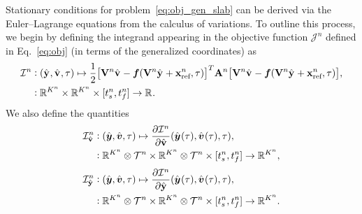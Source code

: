 Stationary conditions for problem~\eqref{eq:obj_gen_slab} can be derived via 
	the Euler--Lagrange equations from the
calculus of variations. To outline this process, we begin by defining the
integrand appearing in the objective function $\mathcal{J}^n$ defined in Eq.~\eqref{eq:obj} (in terms of the generalized
coordinates) as 
\begin{equation}\label{eq:integrand}
\begin{split}
 \minintegrandArg{n} & \vcentcolon
(\genstateyDiscreteArgnt{}, \genstateyDiscreteDotArgnt{},\timeDummy) \mapsto \frac{1}{2} \big[
\basisspaceArg{n} \genstateyDiscreteDotArgnt{} - \velocity(\basisspaceArg{n} \genstateyDiscreteArgnt{}
+ \stateInterceptArg{n},\timeDummy ) \big]^T \stweightingMatArgt{n}{t} \big[
\basisspaceArg{n} \genstateyDiscreteDotArgnt{}  - \velocity(\basisspaceArg{n} \genstateyDiscreteArgnt{} +
\stateInterceptArg{n},\timeDummy) \big], \\ & \vcentcolon \RR{\romdimArg{n}} \times \RR{\romdimArg{n}} \times [\timeStartArg{n},\timeEndArg{n}]
 \rightarrow \RR{} .  
\end{split}
\end{equation}
We also define the quantities
\begin{equation}
\begin{split}
\dIdVArg{n}  & \vcentcolon
(\genstatey , \genstateyDot, \timeDummy) \mapsto \frac{\partial \minintegrandArg{n}}{\partial \genstateyDiscreteDot} (\genstateyArg{}{\timeDummy}, \genstateyDotArg{}{\timeDummy},\timeDummy), \\ 
& \vcentcolon  \RR{\romdimArg{n}} \otimes \timeSpaceArg{n} \times \RR{\romdimArg{n}} \otimes \timeSpaceArg{n} \times [\timeStartArg{n},\timeEndArg{n}]
 \rightarrow \RR{\romdimArg{n}} ,
\end{split}
\end{equation}
\begin{equation}
\begin{split}
\dIdYArg{n}  & \vcentcolon
(\genstatey , \genstateyDot, \timeDummy) \mapsto \frac{\partial \minintegrandArg{n}}{\partial \genstateyDiscrete} (\genstateyArg{}{\timeDummy}, \genstateyDotArg{}{\timeDummy},\timeDummy), \\ 
& \vcentcolon  \RR{\romdimArg{n}} \otimes \timeSpaceArg{n} \times \RR{\romdimArg{n}} \otimes \timeSpaceArg{n} \times [\timeStartArg{n},\timeEndArg{n}]
 \rightarrow \RR{\romdimArg{n}} .
\end{split}
\end{equation}
